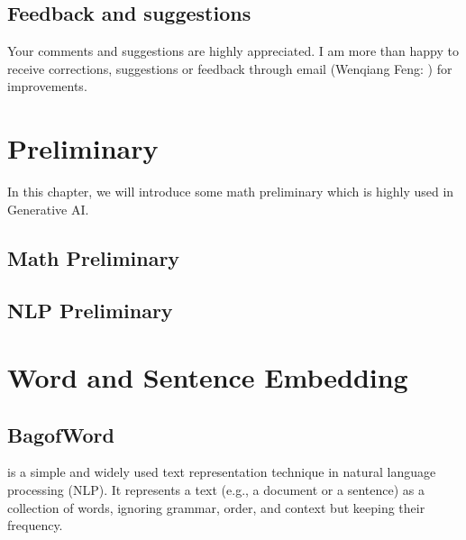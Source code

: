 \documentclass[letterpaper,11pt,english]{sphinxmanual}
\begin{document}
\section{Feedback and suggestions}
\label{\detokenize{preface:feedback-and-suggestions}}
\sphinxAtStartPar
Your comments and suggestions are highly appreciated. I am more than happy to receive
corrections, suggestions or feedback through email (Wenqiang Feng: ) for improvements.

\sphinxstepscope


\chapter{Preliminary}
\label{\detokenize{prelim:preliminary}}\label{\detokenize{prelim:prelim}}\label{\detokenize{prelim::doc}}
\sphinxAtStartPar
In this chapter, we will introduce some math preliminary which is highly
used in Generative AI.


\section{Math Preliminary}
\label{\detokenize{prelim:math-preliminary}}

\section{NLP Preliminary}
\label{\detokenize{prelim:nlp-preliminary}}
\sphinxstepscope


\chapter{Word and Sentence Embedding}
\label{\detokenize{embedding:word-and-sentence-embedding}}\label{\detokenize{embedding:embedding}}\label{\detokenize{embedding::doc}}

\section{Bag\sphinxhyphen{}of\sphinxhyphen{}Word}
\label{\detokenize{embedding:bag-of-word}}
\sphinxAtStartPar
{} is a simple and widely used text representation technique in natural language processing (NLP). It represents a text (e.g., a document or a sentence) as a collection of words, ignoring grammar, order, and context but keeping their frequency.
\end{document}
